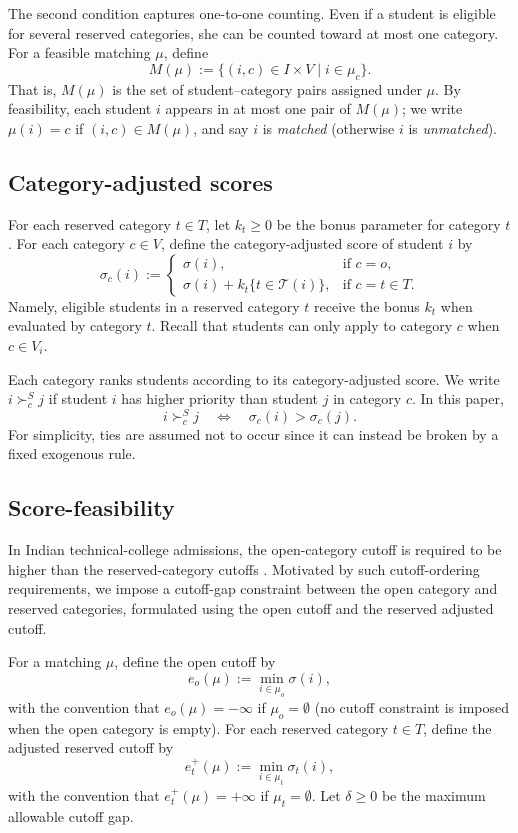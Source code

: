 \documentclass[10pt]{article}
\newcommand{\T}{\mathcal{T}}
\newcommand{\1}{\mathbf{1}}
\newcommand{\yao}[1]{{\color{blue}#1}}
\begin{document}
The second condition captures one-to-one counting. Even if a student is eligible for several reserved categories, she can be counted toward at most one category. For a feasible matching $\mu$, define
\[
M(\mu) := \{(i,c)\in I\times V \mid i\in \mu_c\}.
\]
That is, $M(\mu)$ is the set of student--category pairs assigned under $\mu$. By feasibility, each student $i$ appears in at most one pair of $M(\mu)$; we write $\mu(i)=c$ if $(i,c)\in M(\mu)$, and say $i$ is \emph{matched} (otherwise $i$ is \emph{unmatched}).

\subsection{Category-adjusted scores}
For each reserved category $t\in T$, let $k_t\ge 0$ be the bonus parameter for category $t$. For each category $c\in V$, define the category-adjusted score of student $i$ by
\[
\sigma_c(i)
:=
\begin{cases}
\sigma(i), & \text{if } c=o,\\[3pt]
\sigma(i)+k_t\{t\in\T(i)\}, & \text{if } c=t\in T.
\end{cases}
\]
Namely, eligible students in a reserved category $t$ receive the bonus $k_t$ when evaluated by category $t$. Recall that students can only apply to category $c$ when $c\in V_i$.

Each category ranks students according to its category-adjusted score. We write $i\succ_c^S j$ if student $i$ has higher priority than student $j$ in category $c$. In this paper,
\[
i\succ_c^S j
\quad \Longleftrightarrow \quad
\sigma_c(i)>\sigma_c(j).
\]
For simplicity, ties are assumed not to occur since it can instead be broken by a fixed exogenous rule.

\subsection{Score-feasibility}

In Indian technical-college admissions, the open-category cutoff is required to be higher than the reserved-category cutoffs \citep{AyTu23a}. Motivated by such cutoff-ordering requirements, we impose a cutoff-gap constraint between the open category and reserved categories, formulated using the open cutoff and the reserved adjusted cutoff.

For a matching $\mu$, define the open cutoff by
\[
e_o(\mu):=\min_{i\in\mu_o}\sigma(i),
\]
with the convention that $e_o(\mu)=-\infty$ if $\mu_o=\emptyset$ (no cutoff constraint is imposed when the open category is empty). 
For each reserved category $t\in T$, define the adjusted reserved cutoff by
\[
e_t^+(\mu):=\min_{i\in\mu_t}\sigma_t(i),
\]
with the convention that $e_t^+(\mu)=+\infty$ if $\mu_t=\emptyset$. Let $\delta\ge 0$ be the maximum allowable cutoff gap.
\end{document}
